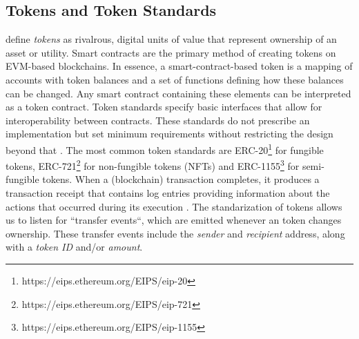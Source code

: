 \documentclass[12pt,a4paper,titlepage,oneside,english]{article}
\begin{document}
\subsection{Tokens and Token Standards}
\cite{roth2019tokenization} define \textit{tokens} as rivalrous, digital units of value that represent ownership of an asset or utility. Smart contracts are the primary method of creating tokens on EVM-based blockchains. In essence, a smart-contract-based token is a mapping of accounts with token balances and a set of functions defining how these balances can be changed. Any smart contract containing these elements can be interpreted as a token contract. \citep{roth2019tokenization} \newline
Token standards specify basic interfaces that allow for interoperability between contracts. These standards do not prescribe an implementation but set minimum requirements without restricting the design beyond that \citep{mastering_ethereum}. 
The most common token standards are ERC-20\footnote{https://eips.ethereum.org/EIPS/eip-20} for fungible tokens, ERC-721\footnote{https://eips.ethereum.org/EIPS/eip-721} for non-fungible tokens (NFTs) and ERC-1155\footnote{https://eips.ethereum.org/EIPS/eip-1155} for semi-fungible tokens.\newline
When a (blockchain) transaction completes, it produces a transaction receipt that contains log entries providing information about the actions that occurred during its execution \citep{mastering_ethereum}. The standarization of tokens allows us to listen for ``transfer events``, which are emitted whenever an token changes ownership.
These transfer events include the \textit{sender} and \textit{recipient} address, along with a \textit{token ID} and/or \textit{amount}. 



\end{document}

